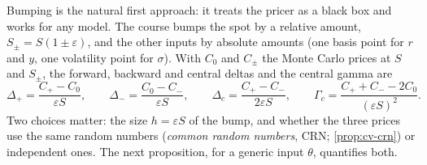 Bumping is the natural first approach: it treats the pricer as a black box and works for any
model. The course bumps the spot by a relative amount, $S_\pm=S(1\pm\varepsilon)$, and the
other inputs by absolute amounts (one basis point for $r$ and $y$, one volatility point for
$\sigma$). With $C_0$ and $C_\pm$ the Monte Carlo prices at $S$ and $S_\pm$, the forward,
backward and central deltas and the central gamma are
\begin{equation}\label{eq:gr-course-fd}
  \Delta_+=\frac{C_+-C_0}{\varepsilon S},\qquad \Delta_-=\frac{C_0-C_-}{\varepsilon S},\qquad
  \Delta_c=\frac{C_+-C_-}{2\varepsilon S},\qquad \Gamma_c=\frac{C_++C_--2C_0}{(\varepsilon S)^2}.
\end{equation}
Two choices matter: the size $h=\varepsilon S$ of the bump, and whether the three prices use
the same random numbers (\emph{common random numbers}, CRN; \cref{prop:cv-crn}) or
independent ones. The next proposition, for a generic input $\theta$, quantifies both.

